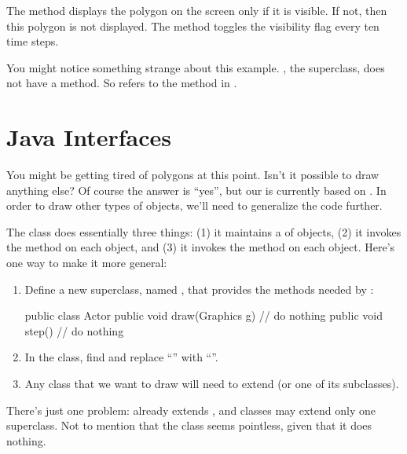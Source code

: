 The  method displays the polygon on the screen only if it is visible.
If not, then this polygon is not displayed.
The  method toggles the visibility flag every ten time steps.

You might notice something strange about this example.
, the superclass, does not have a  method.
So  refers to the  method in .



\section{Java Interfaces}

You might be getting tired of polygons at this point.
Isn't it possible to draw anything else?
Of course the answer is ``yes'', but our  is currently based on .
In order to draw other types of objects, we'll need to generalize the code further.

The  class does essentially three things: (1) it maintains a  of objects, (2) it invokes the  method on each object, and (3) it invokes the  method on each object.
Here's one way to make it more general:

\begin{enumerate}

\item
Define a new superclass, named , that provides the methods needed by :

\begin{code}
public class Actor {
    public void draw(Graphics g) {
        // do nothing
    }
    public void step() {
        // do nothing
    }
}
\end{code}

\item
In the  class, find and replace ``'' with ``''.

\item
Any class that we want to draw will need to extend  (or one of its subclasses).

\end{enumerate}

There's just one problem:  already extends , and classes may extend only one superclass.
Not to mention that the  class seems pointless, given that it does nothing.

